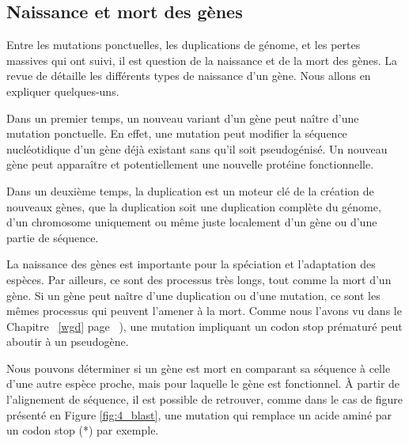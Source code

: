 \subsection{Naissance et mort des gènes}\label{naissance}
\par Entre les mutations ponctuelles, les duplications de génome, et les pertes massives qui ont suivi, il est question de la naissance et de la mort des gènes. La revue de\cite{kaessmann_origins_2010} détaille les différents types de naissance d’un gène. Nous allons en expliquer quelques-uns. 
\par Dans un premier temps, un nouveau variant d’un gène peut naître d’une mutation ponctuelle. En effet, une mutation peut modifier la séquence nucléotidique d’un gène déjà existant sans qu’il soit pseudogénisé. Un nouveau gène peut apparaître et potentiellement une nouvelle protéine fonctionnelle. 
\par Dans un deuxième temps, la duplication est un moteur clé de la création de nouveaux gènes, que la duplication soit une duplication complète du génome, d’un chromosome uniquement ou même juste localement d’un gène ou d’une partie de séquence. 
\par La naissance des gènes est importante pour la spéciation et l’adaptation des espèces. Par ailleurs, ce sont des processus très longs, tout comme la mort d’un gène. Si un gène peut naître d’une duplication ou d’une mutation, ce sont les mêmes processus qui peuvent l’amener à la mort. Comme nous l’avons vu dans le Chapitre  ~\ref{wgd} page ~\pageref{wgd}), une mutation impliquant un codon stop prématuré peut aboutir à un pseudogène. 
\par Nous pouvons déterminer si un gène est mort en comparant sa séquence à celle d’une autre espèce proche, mais pour laquelle le gène est fonctionnel. À partir de l’alignement de séquence, il est possible de retrouver, comme dans le cas de figure présenté en Figure \ref{fig:4_blast}, une mutation qui remplace un acide aminé par un codon stop (*) par exemple. \newpage

